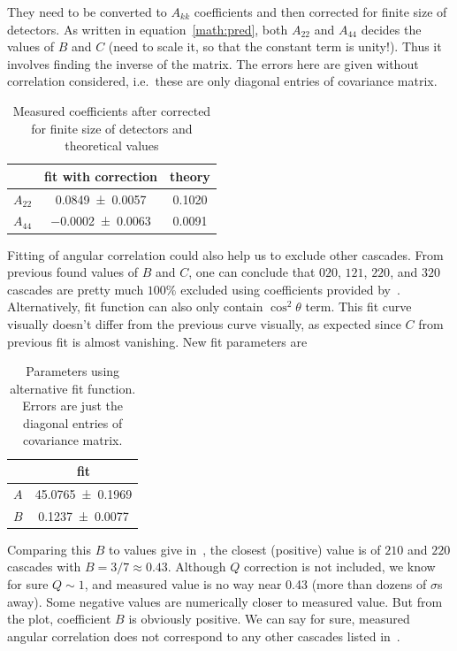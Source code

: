They need to be converted to $A_{kk}$ coefficients and then corrected for finite size of detectors. As written in equation~\eqref{math:pred}, both $A_{22}$ and $A_{44}$ decides the values of $B$ and $C$ (need to scale it, so that the constant term is unity!). Thus it involves finding the inverse of the matrix. The errors here are given without correlation considered, i.e.~these are only diagonal entries of covariance matrix.
\begin{table}[htpb]
   \centering
   \label{tab:Akk}
 \begin{tabular}{ccc}
   \toprule
   &  fit with correction &  theory \\
   \midrule
   $A_{22}$ & \num{0.0849 +- 0.0057} & 0.1020 \\
   $A_{44}$  & \num{-0.0002 +- 0.0063}& 0.0091 \\
   \bottomrule
\end{tabular}
\caption{Measured coefficients after corrected for finite size of detectors and theoretical values}
\end{table}

Fitting of angular correlation could also help us to exclude other cascades. From previous found values of $B$ and $C$, one can conclude that $020$, $121$, $220$, and $320$ cascades are pretty much $100 \%$ excluded using coefficients provided by~\cite{deutsch}. Alternatively, fit function can also only contain $\cos^2\theta$ term. This fit curve visually doesn't differ from the previous curve visually, as expected since $C$ from previous fit is almost vanishing. New fit parameters are
\begin{table}[ht]
   \centering
   \begin{tabular}{cc}
      \toprule
   & fit  \\
      \midrule
      $A$ &\num{45.0765 +- 0.1969} \\
      $B$ & \num{0.1237 +- 0.0077} \\
      \bottomrule
   \end{tabular}
   \caption{Parameters using alternative fit function. Errors are just the diagonal entries of covariance matrix.}
   \label{tab:ABC}
\end{table}
Comparing this $B$ to values give in~\cite{deutsch}, the closest (positive) value is of $210$ and $220$ cascades with $B=3/7\approx\num{0.43}$. Although $Q$ correction is not included, we know for sure $Q \sim 1$, and measured value is no way near \num{0.43} (more than dozens of $\sigma$s away). Some negative values are numerically closer to measured value. But from the plot, coefficient $B$ is obviously positive. We can say for sure, measured angular correlation does not correspond to any other cascades listed in~\cite{deutsch}.
